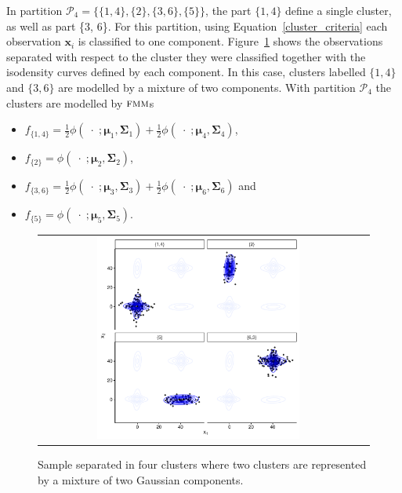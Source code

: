 \documentclass[submit]{smj}
\theoremstyle{definition}
\newcommand{\m}[1]{\boldsymbol{#1}}
\newcommand{\fmm}{\textsc{fmm}\xspace}
\begin{document}
In partition $\mathcal{P}_4 = \{\{1, 4\},\{2\}, \{3, 6\}, \{5\} \}$, the part $\{1, 4\}$ define a single cluster, as well as part \{3, 6\}. For this partition, using Equation~\ref{cluster_criteria} each observation $\m x_i$ is classified to one component. Figure~\ref{ex_two_one} shows the observations separated with respect to the cluster they were classified together with the isodensity curves defined by each component. In this case, clusters labelled $\{1,4\}$ and $\{3, 6\}$ are modelled by a mixture of two components. With partition $\mathcal{P}_4$ the clusters are modelled by $\fmm$s
\begin{itemize}
\item $f_{\{1,4\}} = \frac{1}{2} \phi(\;\cdot\; ;  \m\mu_1, \m\Sigma_1) + \frac{1}{2} \phi(\;\cdot\; ;  \m\mu_4, \m\Sigma_4)$, 
\item $f_{\{2\}} = \phi(\;\cdot\; ;  \m\mu_2, \m\Sigma_2)$, 
\item $f_{\{3,6\}} =  \frac{1}{2} \phi(\;\cdot\; ;  \m\mu_3, \m\Sigma_3) + \frac{1}{2} \phi(\;\cdot\; ;  \m\mu_6, \m\Sigma_6)$ and
\item $f_{\{5\}} = \phi(\;\cdot\; ;  \m\mu_5, \m\Sigma_5)$.
\end{itemize}

\begin{figure}[h]
\begin{center}
\begin{tabular}{cc}
  \includegraphics[width=0.65\textwidth]{figures/partition-example-part4.pdf} \\
 \end{tabular}
 \caption{Sample separated in four clusters where two clusters are represented by a mixture of two Gaussian components.}\label{ex_two_one}
\end{center}
\end{figure}
\end{document}
